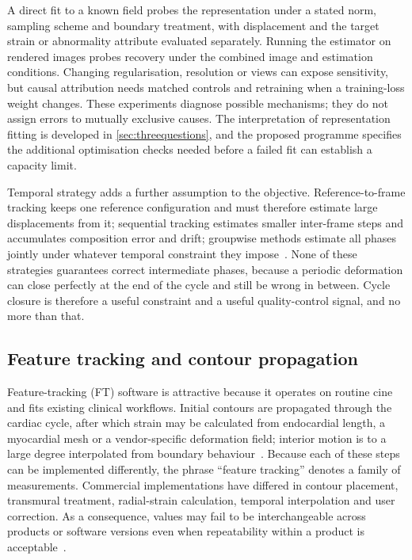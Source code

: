 A direct fit to a known field probes the representation under a stated norm, sampling scheme and boundary treatment, with displacement and the target strain or abnormality attribute evaluated separately. Running the estimator on rendered images probes recovery under the combined image and estimation conditions. Changing regularisation, resolution or views can expose sensitivity, but causal attribution needs matched controls and retraining when a training-loss weight changes. These experiments diagnose possible mechanisms; they do not assign errors to mutually exclusive causes. The interpretation of representation fitting is developed in \cref{sec:threequestions}, and the proposed programme specifies the additional optimisation checks needed before a failed fit can establish a capacity limit.

Temporal strategy adds a further assumption to the objective. Reference-to-frame tracking keeps one reference configuration and must therefore estimate large displacements from it; sequential tracking estimates smaller inter-frame steps and accumulates composition error and drift; groupwise methods estimate all phases jointly under whatever temporal constraint they impose~\cite{metz2011,chen2024}. None of these strategies guarantees correct intermediate phases, because a periodic deformation can close perfectly at the end of the cycle and still be wrong in between. Cycle closure is therefore a useful constraint and a useful quality-control signal, and no more than that.

\subsection{Feature tracking and contour propagation}\label{sec:ft}

Feature-tracking (FT) software is attractive because it operates on routine cine and fits existing clinical workflows. Initial contours are propagated through the cardiac cycle, after which strain may be calculated from endocardial length, a myocardial mesh or a vendor-specific deformation field; interior motion is to a large degree interpolated from boundary behaviour~\cite{pedrizzetti2016}. Because each of these steps can be implemented differently, the phrase ``feature tracking'' denotes a family of measurements. Commercial implementations have differed in contour placement, transmural treatment, radial-strain calculation, temporal interpolation and user correction. As a consequence, values may fail to be interchangeable across products or software versions even when repeatability within a product is acceptable~\cite{lim2021,militaru2021}.

